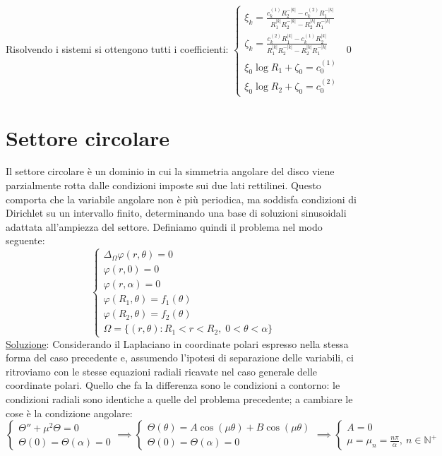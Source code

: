\documentclass[a4paper,12pt]{report}
\begin{document}
Risolvendo i sistemi si ottengono tutti i coefficienti: $\displaystyle\begin{cases}


\xi_k =
\displaystyle
\frac{c_k^{(1)} R_2^{-|k|} - c_k^{(2)} R_1^{-|k|}}
{R_1^{|k|} R_2^{-|k|} - R_2^{|k|} R_1^{-|k|}} \\[1.2em]

\zeta_k =
\displaystyle
\frac{c_k^{(2)} R_1^{|k|} - c_k^{(1)} R_2^{|k|}}
{R_1^{|k|} R_2^{-|k|} - R_2^{|k|} R_1^{-|k|}}
\\\xi_0 \log R_1 + \zeta_0 = c_0^{(1)} 
\\\xi_0 \log R_2 + \zeta_0 = c_0^{(2)}
\end{cases}$ \qed

\newpage

\section{Settore circolare}
Il settore circolare è un dominio in cui la simmetria angolare del disco viene parzialmente rotta dalle condizioni imposte sui due lati rettilinei. Questo comporta che la variabile angolare non è più periodica, ma soddisfa condizioni di Dirichlet su un intervallo finito, determinando una base di soluzioni sinusoidali adattata all’ampiezza del settore. Definiamo quindi il problema nel modo seguente:
\[
\begin{cases}
\Delta_\Omega \varphi(r,\theta) = 0 \\
\varphi(r,0)=0 
\\\varphi(r,\alpha)=0 \\
\varphi(R_1,\theta)=f_1(\theta) 
\\\varphi(R_2,\theta)=f_2(\theta)
\\\Omega=\{(r,\theta): R_1<r<R_2,\; 0<\theta<\alpha\}
\end{cases}
\]
\underline{Soluzione}: Considerando il Laplaciano in coordinate polari espresso nella stessa forma del caso precedente e, assumendo l'ipotesi di separazione delle variabili, ci ritroviamo con le stesse equazioni radiali ricavate nel caso generale delle coordinate polari. Quello che fa la differenza sono le condizioni a contorno: le condizioni radiali sono identiche a quelle del problema precedente; a cambiare le cose è la condizione angolare:
\[\begin{cases}
    \Theta ''+\mu^2\Theta=0
    \\\Theta(0)=\Theta(\alpha)=0
\end{cases}\implies\begin{cases}
\Theta(\theta)=A\cos(\mu\theta)+B\cos(\mu\theta)
\\\Theta(0)=\Theta(\alpha)=0
\end{cases}\implies\begin{cases}
    A=0
    \\\mu=\mu_n=\frac{n\pi}{\alpha}, \ n\in \mathbb{N}^+
\end{cases}\]
\end{document}
